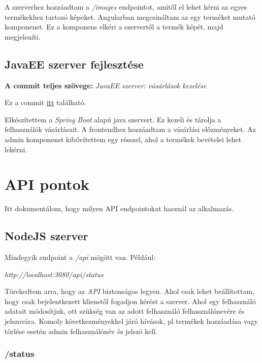 \documentclass[]{article}
\begin{document}
A szerverhez hozzáadtam a \textit{/images} endpointot, amitől el lehet kérni az egyes termékekhez tartozó képeket. Angularban megcsináltam az egy terméket mutató komponenst. Ez a komponens elkéri a szervertől a termék képét, majd megjeleníti.

\subsection{JavaEE szerver fejlesztése}

\noindent
\textbf{A commit teljes szövege:} \textit{JavaEE szerver: vásárlások kezelése }

\bigskip
\noindent
Ez a commit \href{https://github.com/Gtomika/prf-project/commit/5dcc9df3c42db872387fee519fe37f45b69bf757}{itt} található.
\bigskip

Elkészítettem a \textit{Spring Boot} alapú java szervert. Ez kezeli és tárolja a felhasználók vásárlásait. A frontendhez hozzáadtam a vásárlási előzményeket. Az admin komponenst kibővítettem egy résszel, ahol a termékek bevételei lehet lekérni.

\section{API pontok}

Itt dokumentálom, hogy milyen API endpointokat használ az alkalmazás.

\subsection{NodeJS szerver}

Mindegyik endpoint a \textit{/api} mögött van. Például:

\bigskip
\begin{center}
	\textit{http://localhost:3080/api/status}
\end{center}

Törekedtem arra, hogy az \textit{API} biztonságos legyen. Ahol csak lehet beállítottam, hogy csak bejelentkezett klienstől fogadjon kérést a szerver. Ahol egy felhasználó adatait módosítjuk, ott szükség van az adott felhasználó felhasználónevére és jelszavára. Komoly következményekkel járó hívások, pl termékek hozzáadása vagy törlése esetén admin felhasználónév és jelszó kell.

\subsubsection{/status}
\end{document}
